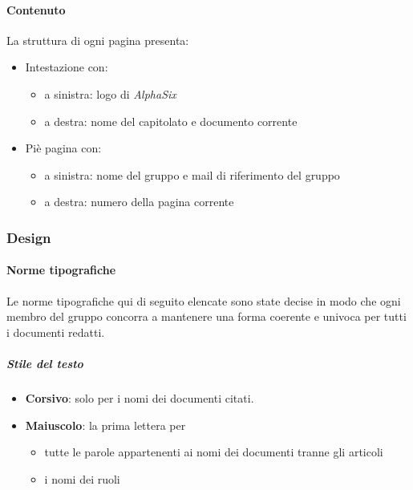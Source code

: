 			\paragraph{Contenuto}\label{PS:Documentazione:Struttura:Contenuto}
			La struttura di ogni pagina presenta:
			\begin{itemize}
				\item Intestazione con:
				\begin{itemize}
					\item a sinistra: logo di \emph{AlphaSix}
					\item a destra: nome del capitolato e documento corrente
				\end{itemize}
				\item Piè pagina con:
				\begin{itemize}
					\item a sinistra: nome del gruppo e mail di riferimento del gruppo
					\item a destra: numero della pagina corrente
				\end{itemize}
			\end{itemize}


		\subsubsection{Design}\label{PS:Documentazione:Design}

			\paragraph{Norme tipografiche}\label{PS:Documentazione:Design:NormeT}
			Le norme tipografiche qui di seguito elencate sono state decise in modo che ogni membro del gruppo concorra a mantenere una forma coerente e univoca
			per tutti i documenti redatti.

			\subparagraph{Stile del testo}\label{PS:Documentazione:Design:NormeT:StileTesto}
			\begin{itemize}
				\item \textbf{Corsivo}: solo per i nomi dei documenti citati.
				\item \textbf{Maiuscolo}: la prima lettera per
				\begin{itemize}
					\item tutte le parole appartenenti ai nomi dei documenti tranne gli articoli
					\item i nomi dei ruoli
				\end{itemize}
			\end{itemize}

